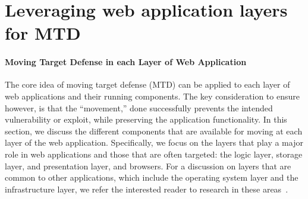 \section{Leveraging web application layers for MTD}
\paragraph{Moving Target Defense in each Layer of Web Application}
The core idea of moving target defense (MTD) can be applied to each layer of web applications and their running components. The key consideration to ensure however, is that the ``movement,'' done successfully prevents the intended vulnerability or exploit, while preserving the application functionality. 
In this section, we discuss the different components that are available for moving at each layer of the web application. Specifically, we focus on the layers that play a major role in web applications and those that are often targeted: the logic layer, storage layer, and presentation layer, and browsers.
For a discussion on layers that are common to other applications, 
which include the operating system layer and the infrastructure layer,
we refer the interested reader to research in these areas~\cite{team2003pax,barrantes2003randomized,larsen2014sok,wartell2012binary,williams2009security,salamat2011runtime,vikram2013,dunlop2011,carvalho2014,li2014}.


